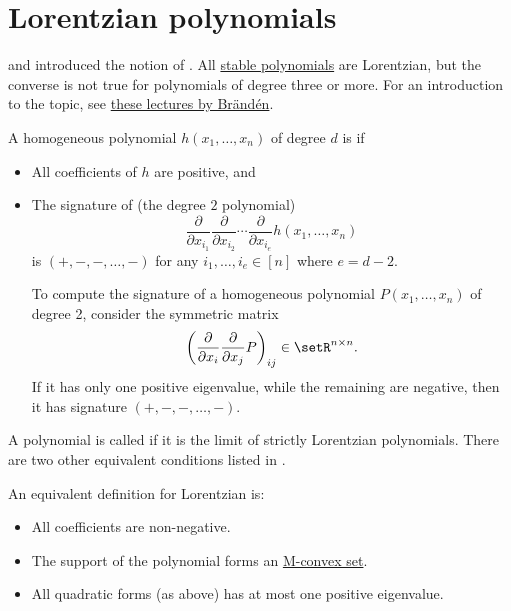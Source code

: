 


\section[lorentzianPolynomial]{Lorentzian polynomials}

 and  introduced the notion of
 \cite{BrandenHuh2020}.
All \hyperref[stablePolynomial]{stable polynomials} are Lorentzian, but the converse is not true for polynomials
of degree three or more.
For an introduction to the topic, see \href{https://www2.math.upenn.edu/~jhaglund/IPAC/2022.html}{these lectures by Brändén}.


\begin{definition}

A homogeneous polynomial $h(x_1,\dotsc,x_n)$ of degree $d$ is  if
\begin{itemize}
 \item All coefficients of $h$ are positive, and
 \item The signature of (the degree $2$ polynomial)
 \[
   \frac{\partial}{\partial x_{i_1}}\frac{\partial}{\partial x_{i_2}} \dotsm \frac{\partial}{\partial x_{i_e}} h(x_1,\dotsc,x_n)
 \]
 is $(+,-,-,\dotsc,-)$ for any $i_1,\dotsc,i_e \in [n]$ where $e = d-2$.

 To compute the signature of a homogeneous polynomial $P(x_1,\dotsc,x_n)$ of degree 2,
 consider the symmetric matrix
 \[
  \left(  \frac{\partial}{\partial x_{i}}\frac{\partial}{\partial x_{j}} P \right)_{ij} \in \setR^{n \times n}.
 \]
 If it has only one positive eigenvalue, while the remaining are negative, then it has signature $(+,-,-,\dotsc,-)$.

\end{itemize}

A polynomial is called  if it is the limit of strictly Lorentzian polynomials.
There are two other equivalent conditions listed in \cite{HuhMatherneMezarosDizier2022}.

An equivalent definition for Lorentzian is:

\begin{itemize}
 \item All coefficients are non-negative.
 \item The support of the polynomial forms an \hyperref[MConvexity]{M-convex set}.
 \item All quadratic forms (as above) has at most one positive eigenvalue.
\end{itemize}

\end{definition}

